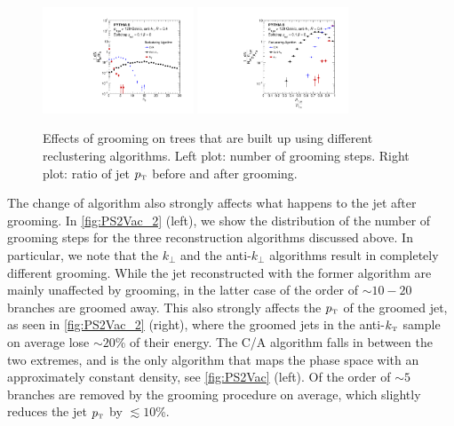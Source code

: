 \begin{figure}[t!]
\centering
\includegraphics[width=0.4\textwidth]{figures/SDAlgorithms/ndropClusteringComp.pdf}%
\includegraphics[width=0.4\textwidth]{figures/SDAlgorithms/ptratioClusteringComp.pdf}%
\caption{Effects of grooming on trees that are built up using different reclustering algorithms. Left plot: number of grooming steps. Right plot: ratio of jet $p_{\text{\tiny T}}$ before and after grooming.
}
\label{fig:PS2Vac_2}
\end{figure}
The change of algorithm also strongly affects what happens to the jet after grooming. In \autoref{fig:PS2Vac_2} (left), we show the distribution of the number of grooming steps for the three reconstruction algorithms discussed above. In particular, we note that the $k_\perp$ and the anti-$k_\perp$ algorithms result in completely different grooming. While the jet reconstructed with the former algorithm are mainly unaffected by grooming, in the latter case of the order of $\sim 10-20$ branches are groomed away. This also strongly affects the $p_{\text{\tiny T}}$ of the groomed jet, as seen in \autoref{fig:PS2Vac_2} (right), where the groomed jets in the anti-$k_{\text{\tiny T}}$ sample on average lose $\sim 20$\% of their energy. The C/A algorithm falls in between the two extremes, and is the only algorithm that maps the phase space with an approximately constant density, see \autoref{fig:PS2Vac} (left). Of the order of $\sim 5$ branches are removed by the grooming procedure on average, which slightly reduces the jet $p_{\text{\tiny T}}$ by $\lesssim 10$\%.

